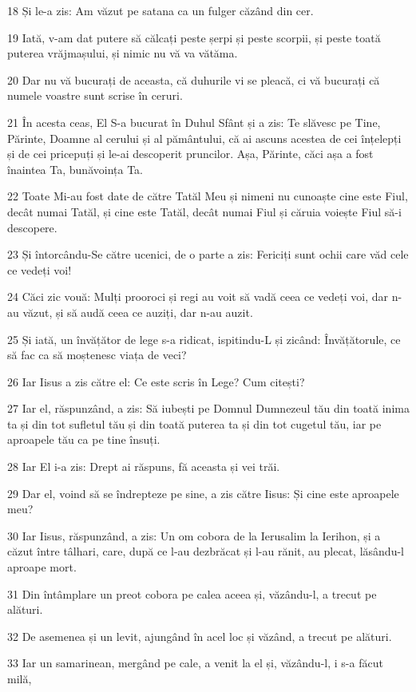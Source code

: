 \par 18 Și le-a zis: Am văzut pe satana ca un fulger căzând din cer.
\par 19 Iată, v-am dat putere să călcați peste șerpi și peste scorpii, și peste toată puterea vrăjmașului, și nimic nu vă va vătăma.
\par 20 Dar nu vă bucurați de aceasta, că duhurile vi se pleacă, ci vă bucurați că numele voastre sunt scrise în ceruri.
\par 21 În acesta ceas, El S-a bucurat în Duhul Sfânt și a zis: Te slăvesc pe Tine, Părinte, Doamne al cerului și al pământului, că ai ascuns acestea de cei înțelepți și de cei pricepuți și le-ai descoperit pruncilor. Așa, Părinte, căci așa a fost înaintea Ta, bunăvoința Ta.
\par 22 Toate Mi-au fost date de către Tatăl Meu și nimeni nu cunoaște cine este Fiul, decât numai Tatăl, și cine este Tatăl, decât numai Fiul și căruia voiește Fiul să-i descopere.
\par 23 Și întorcându-Se către ucenici, de o parte a zis: Fericiți sunt ochii care văd cele ce vedeți voi!
\par 24 Căci zic vouă: Mulți prooroci și regi au voit să vadă ceea ce vedeți voi, dar n-au văzut, și să audă ceea ce auziți, dar n-au auzit.
\par 25 Și iată, un învățător de lege s-a ridicat, ispitindu-L și zicând: Învățătorule, ce să fac ca să moștenesc viața de veci?
\par 26 Iar Iisus a zis către el: Ce este scris în Lege? Cum citești?
\par 27 Iar el, răspunzând, a zis: Să iubești pe Domnul Dumnezeul tău din toată inima ta și din tot sufletul tău și din toată puterea ta și din tot cugetul tău, iar pe aproapele tău ca pe tine însuți.
\par 28 Iar El i-a zis: Drept ai răspuns, fă aceasta și vei trăi.
\par 29 Dar el, voind să se îndrepteze pe sine, a zis către Iisus: Și cine este aproapele meu?
\par 30 Iar Iisus, răspunzând, a zis: Un om cobora de la Ierusalim la Ierihon, și a căzut între tâlhari, care, după ce l-au dezbrăcat și l-au rănit, au plecat, lăsându-l aproape mort.
\par 31 Din întâmplare un preot cobora pe calea aceea și, văzându-l, a trecut pe alături.
\par 32 De asemenea și un levit, ajungând în acel loc și văzând, a trecut pe alături.
\par 33 Iar un samarinean, mergând pe cale, a venit la el și, văzându-l, i s-a făcut milă,
